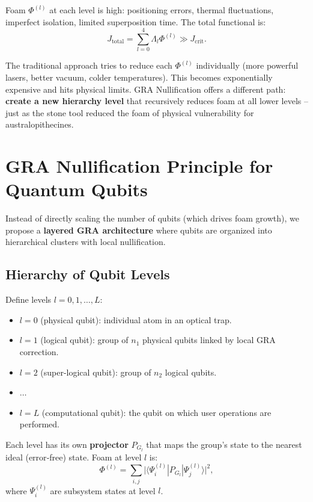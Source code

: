 \documentclass[12pt,a4paper]{article}
\begin{document}
Foam \(\Phi^{(l)}\) at each level is high: positioning errors, thermal fluctuations, imperfect isolation, limited superposition time. The total functional is:
\[
J_{\text{total}} = \sum_{l=0}^{4} \Lambda_l \Phi^{(l)} \gg J_{\text{crit}}.
\]

The traditional approach tries to reduce each \(\Phi^{(l)}\) individually (more powerful lasers, better vacuum, colder temperatures). This becomes exponentially expensive and hits physical limits. GRA Nullification offers a different path: \textbf{create a new hierarchy level} that recursively reduces foam at all lower levels – just as the stone tool reduced the foam of physical vulnerability for australopithecines.

\section{GRA Nullification Principle for Quantum Qubits}

Instead of directly scaling the number of qubits (which drives foam growth), we propose a \textbf{layered GRA architecture} where qubits are organized into hierarchical clusters with local nullification.

\subsection{Hierarchy of Qubit Levels}

Define levels \(l = 0, 1, \dots, L\):

\begin{itemize}
    \item \(l = 0\) (physical qubit): individual atom in an optical trap.
    \item \(l = 1\) (logical qubit): group of \(n_1\) physical qubits linked by local GRA correction.
    \item \(l = 2\) (super-logical qubit): group of \(n_2\) logical qubits.
    \item \(\dots\)
    \item \(l = L\) (computational qubit): the qubit on which user operations are performed.
\end{itemize}

Each level has its own \textbf{projector} \(P_{G_l}\) that maps the group's state to the nearest ideal (error‑free) state. Foam at level \(l\) is:
\[
\Phi^{(l)} = \sum_{i,j} \bigl| \langle \Psi_i^{(l)} | P_{G_l} | \Psi_j^{(l)} \rangle \bigr|^2,
\]
where \(\Psi_i^{(l)}\) are subsystem states at level \(l\).
\end{document}

